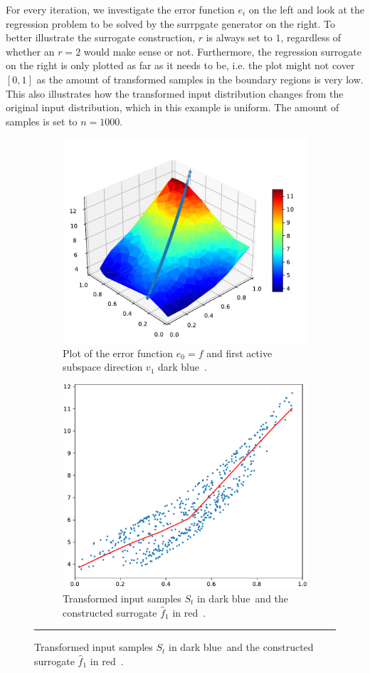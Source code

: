 \documentclass[
  a4paper,  %
  twoside,  %
  bibliography=totoc,
  headsepline,
  cleardoublepage=empty,
  parskip=half,
  draft=false
]{scrbook}
\newcommand{\Hsquare}{%
  \text{\fboxsep=-.2pt\fbox{\rule{0pt}{1.4ex}\rule{1.4ex}{0pt}}}%
}
\newcommand\red{red\,{\setlength\fboxsep{0pt}\colorbox{persian_red}{\Hsquare}} }
\newcommand\darkblue{dark blue\,{\setlength\fboxsep{0pt}\colorbox{charcoal}{\Hsquare}} }
\newcommand{\delimit}{{\color{silver}\noindent\rule{\textwidth}{1pt}}}
\begin{document}
For every iteration, we investigate the error function $e_i$ on the left and look at the regression problem to be solved by the surrpgate generator on the right.
To better illustrate the surrogate construction, $r$ is always set to $1$, regardless of whether an $r=2$ would make sense or not.
Furthermore, the regression surrogate on the right is only plotted as far as it needs to be, i.e. the plot might not cover $[0,1]$ as the amount of transformed samples in the boundary regions is very low.
This also illustrates how the transformed input distribution changes from the original input distribution, which in this example is uniform.
The amount of samples is set to $n=1000$.

\newpage
\begin{mdframed}[style=style]
\begin{figure}[H]
\begin{subfigure}{.5\textwidth}
  \centering
  \includegraphics[width=.8\linewidth]{graphics/pipeline_current_1}
  \caption{Plot of the error function $e_0=f$ and first active subspace direction $v_1$ \darkblue.}
\label{fig:pipeline_current_1}
\end{subfigure}%
\begin{subfigure}{.5\textwidth}
  \centering
  \includegraphics[width=.7\linewidth]{graphics/pipeline_local_1}
  \caption{Transformed input samples $S_t$ in \darkblue and the constructed surrogate $\hat{f}_1$ in \red.}
\label{fig:pipeline_local_1}
\end{subfigure}
\delimit
{}
\label{fig:pipeline_1}
\end{figure}
\end{mdframed}
\end{document}
